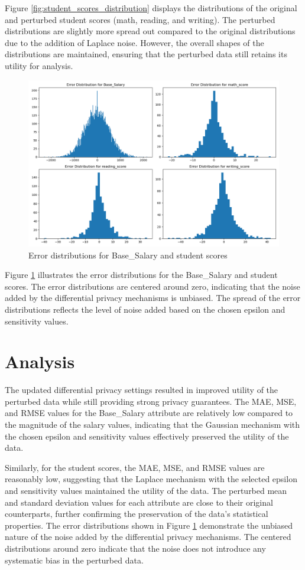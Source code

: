 Figure \ref{fig:student_scores_distribution} displays the distributions of the original and perturbed student scores (math, reading, and writing). The perturbed distributions are slightly more spread out compared to the original distributions due to the addition of Laplace noise. However, the overall shapes of the distributions are maintained, ensuring that the perturbed data still retains its utility for analysis.
\begin{figure}[H]
\centering
\includegraphics[width=\textwidth]{report/media/distribution.png}
\caption{Error distributions for Base\_Salary and student scores}
\label{fig:error-distributions}
\end{figure}

Figure \ref{fig:error-distributions} illustrates the error distributions for the Base\_Salary and student scores. The error distributions are centered around zero, indicating that the noise added by the differential privacy mechanisms is unbiased. The spread of the error distributions reflects the level of noise added based on the chosen epsilon and sensitivity values.
\section{Analysis}
The updated differential privacy settings resulted in improved utility of the perturbed data while still providing strong privacy guarantees. The MAE, MSE, and RMSE values for the Base\_Salary attribute are relatively low compared to the magnitude of the salary values, indicating that the Gaussian mechanism with the chosen epsilon and sensitivity values effectively preserved the utility of the data.

Similarly, for the student scores, the MAE, MSE, and RMSE values are reasonably low, suggesting that the Laplace mechanism with the selected epsilon and sensitivity values maintained the utility of the data. The perturbed mean and standard deviation values for each attribute are close to their original counterparts, further confirming the preservation of the data's statistical properties.
The error distributions shown in Figure \ref{fig:error-distributions} demonstrate the unbiased nature of the noise added by the differential privacy mechanisms. The centered distributions around zero indicate that the noise does not introduce any systematic bias in the perturbed data.
